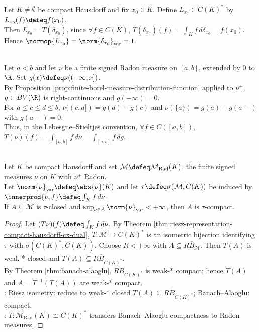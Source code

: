 \begin{example} \label{ex:point-evaluation-dirac-riesz} \\
Let $K\neq\emptyset$ be compact Hausdorff and fix $x_0\in K$. Define $L_{x_0}\in C(K)^*$ by $L_{x_0}(f)\defeq f(x_0)$.\\
Then $L_{x_0}=T(\delta_{x_0})$, since $\forall f\in C(K)$, $T(\delta_{x_0})(f)=\int_K f\,d\delta_{x_0}=f(x_0)$. Hence $\normop{L_{x_0}}=\norm{\delta_{x_0}}_{\mathrm{var}}=1$.
\end{example}

\begin{remark} \label{rem:riesz-interval-stieltjes-form} \\
Let $a<b$ and let $\nu$ be a finite signed Radon measure on $[a,b]$, extended by $0$ to $\R$. Set $g(x)\defeq\nu((-\infty,x])$.\\
By Proposition \ref{prop:finite-borel-measure-distribution-function} applied to $\nu^\pm$, $g\in BV(\R)$ is right-continuous and $g(-\infty)=0$.\\
For $a\leq c\leq d\leq b$, $\nu((c,d])=g(d)-g(c)$ and $\nu(\{a\})=g(a)-g(a-)$ with $g(a-)=0$.\\
Thus, in the Lebesgue--Stieltjes convention, $\forall f\in C([a,b])$, $T(\nu)(f)=\int_{[a,b]}f\,d\nu=\int_{[a,b]}f\,dg$.
\end{remark}

\begin{corollary} \label{cor:weak-star-compact-radon-measure-sets} \\
Let $K$ be compact Hausdorff and set $\mathcal M\defeq\mathcal{M}_{\mathrm{Rad}}(K)$, the finite signed measures $\nu$ on $K$ with $\nu^\pm$ Radon.\\
Let $\norm{\nu}_{\mathrm{var}}\defeq\abs{\nu}(K)$ and let $\tau\defeq\sigma(\mathcal M,C(K))$ be induced by $\innerprod{\nu,f}\defeq\int_K f\,d\nu$.\\
If $A\subseteq\mathcal M$ is $\tau$-closed and $\sup_{\nu\in A}\norm{\nu}_{\mathrm{var}}<+\infty$, then $A$ is $\tau$-compact.
\begin{proof}
Let $(T\nu)(f)\defeq\int_K f\,d\nu$. By Theorem \ref{thm:riesz-representation-compact-hausdorff-cx-dual}, $T:\mathcal M\to C(K)^*$ is an isometric bijection identifying $\tau$ with $\sigma(C(K)^*,C(K))$. Choose $R<+\infty$ with $A\subseteq R\overline{B}_{\mathcal M}$. Then $T(A)$ is weak-* closed and $T(A)\subseteq R\overline{B}_{C(K)^*}$.\\
By Theorem \ref{thm:banach-alaoglu}, $R\overline{B}_{C(K)^*}$ is weak-* compact; hence $T(A)$ and $A=T^{-1}(T(A))$ are weak-* compact.\\
: Riesz isometry: reduce to weak-* closed $T(A)\subseteq R\overline{B}_{C(K)^*}$; Banach--Alaoglu: compact.\\
: $T:\mathcal{M}_{\mathrm{Rad}}(K)\cong C(K)^*$ transfers Banach--Alaoglu compactness to Radon measures.
\end{proof}
\end{corollary}

